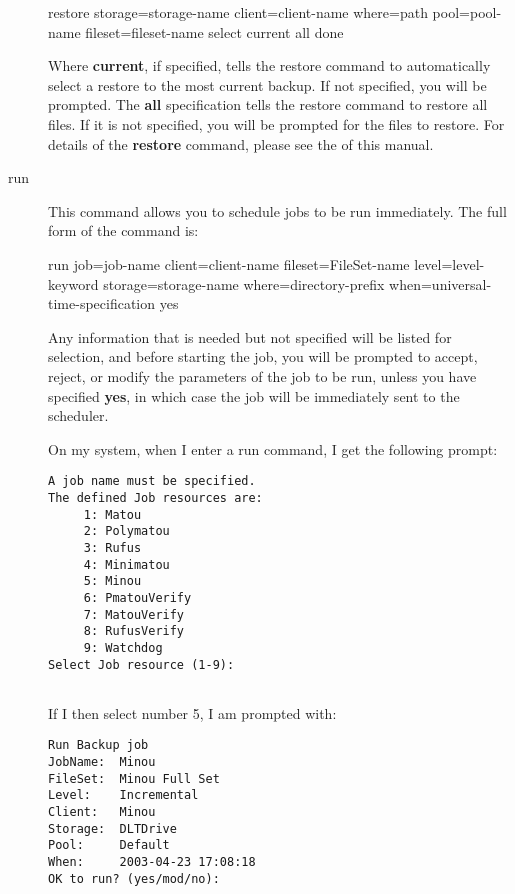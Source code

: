\begin{description}
restore storage=\lt{}storage-name\gt{} client=\lt{}client-name\gt{} 
where=\lt{}path\gt{} pool=\lt{}pool-name\gt{} fileset=\lt{}fileset-name\gt{} 
select current all done  

Where {\bf current}, if specified, tells the restore command  to automatically
select a restore to the most current backup.  If not specified, you will be
prompted. The {\bf all} specification  tells the restore command to restore
all files. If it is not  specified, you will be prompted for the files to
restore.  For details of the {\bf restore} command, please see the  
 of this manual.  

\item [run]
   This command allows you to schedule jobs  to be run immediately. The full form
of the command is:

run job=\lt{}job-name\gt{} client=\lt{}client-name\gt{}
fileset=\lt{}FileSet-name\gt{}  level=\lt{}level-keyword\gt{}
storage=\lt{}storage-name\gt{}  where=\lt{}directory-prefix\gt{}
when=\lt{}universal-time-specification\gt{}  yes  

Any information that is needed but not specified will be  listed for
selection, and before starting the job, you will  be prompted to accept,
reject, or modify the parameters of  the job to be run, unless you have
specified {\bf yes}, in  which case the job will be immediately sent to the
scheduler.  

On my system, when I enter a run command, I get the following  prompt:  

\footnotesize
\begin{verbatim}
A job name must be specified.
The defined Job resources are:
     1: Matou
     2: Polymatou
     3: Rufus
     4: Minimatou
     5: Minou
     6: PmatouVerify
     7: MatouVerify
     8: RufusVerify
     9: Watchdog
Select Job resource (1-9):
     
\end{verbatim}
\normalsize

If I then select number 5, I am prompted with:  

\footnotesize
\begin{verbatim}
Run Backup job
JobName:  Minou
FileSet:  Minou Full Set
Level:    Incremental
Client:   Minou
Storage:  DLTDrive
Pool:     Default
When:     2003-04-23 17:08:18
OK to run? (yes/mod/no):
     
\end{verbatim}
\normalsize


\end{description}
